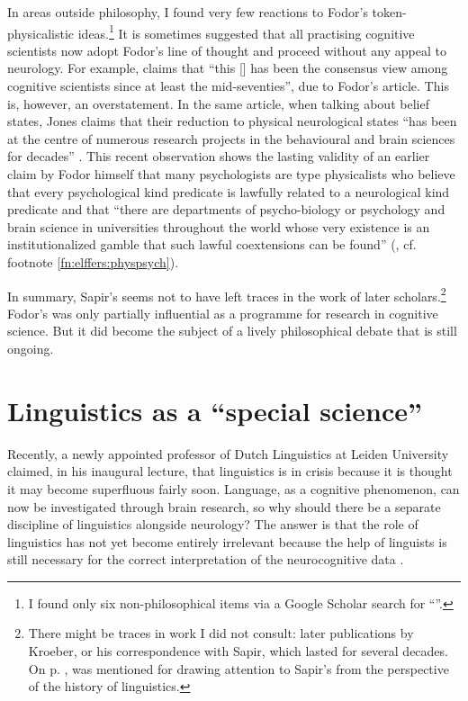 \documentclass[output=paper]{langscibook}
\begin{document}
In areas outside philosophy, I found very few reactions to Fodor's token-phys\-i\-cal\-istic ideas.\footnote{I found only six non-philosophical items via a Google Scholar search for ``''.}  It is sometimes suggested that all practising cognitive scientists now adopt Fodor's line of thought and proceed without any appeal to neurology. For example, \citet{Jones2004}  claims that ``this [] has been the consensus view among cognitive scientists since at least the mid-seventies'', due to Fodor's \citeyear{Fodor1974} article. This is, however, an overstatement. In the same article, when talking about belief states, Jones claims that their reduction to physical neurological states ``has been at the centre of numerous research projects in the behavioural and brain sciences for decades'' \citep[423]{Jones2004}. This recent observation shows the lasting validity of an earlier claim by Fodor himself that many psychologists are type physicalists who believe that every psychological kind predicate is lawfully related to a neurological kind predicate and that ``there are departments of psycho-biology or psychology and brain science in universities throughout the world whose very existence is an institutionalized gamble that such lawful coextensions can be found'' (\citealt[105]{Fodor1974}, cf. footnote \ref{fn:elffers:physpsych}).

In summary, Sapir's  seems not to have left traces in the work of later scholars.\footnote{There might be traces in work I did not consult: later publications by Kroeber, or his correspondence with Sapir, which lasted for several decades. On p. \pageref{q:elffers:silversteinref}, \citet{Silverstein1986} was mentioned for drawing attention to Sapir's  from the perspective of the history of linguistics.} Fodor's  was only partially influential as a programme for research in cognitive science. But it did become the subject of a lively philosophical debate that is still ongoing.

\section{Linguistics as a ``special science''}
\label{sec:elffers:linguisticsasspecialscience}

Recently, a newly appointed professor of Dutch Linguistics at Leiden University claimed, in his inaugural lecture, that linguistics is in crisis because it is thought it may become superfluous fairly soon. Language, as a cognitive phenomenon, can now be investigated through brain research, so why should there be a separate discipline of linguistics alongside neurology? The answer is that the role of linguistics has not yet become entirely irrelevant because the help of linguists is still necessary for the correct interpretation of the neurocognitive data \citep{Barbiers2017}.
\end{document}
